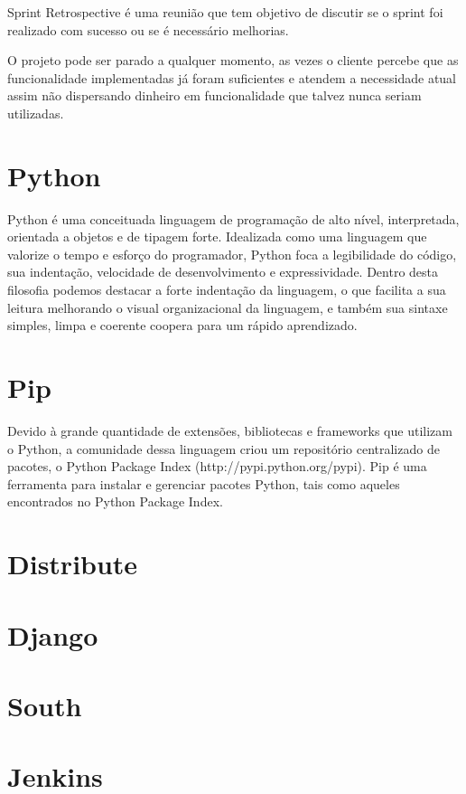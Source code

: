 \documentclass{abnt}
\begin{document}
		Sprint Retrospective é uma reunião que tem objetivo de discutir se o sprint foi realizado com sucesso ou se é
		necessário melhorias.
		
		O projeto pode ser parado a qualquer momento, as vezes o cliente percebe que as funcionalidade implementadas já foram
		suficientes e atendem a necessidade atual assim não dispersando dinheiro em funcionalidade que talvez nunca seriam
		utilizadas.
	
	\section{Python}
	\blindtext
		Python é uma conceituada linguagem de programação de alto nível, interpretada, orientada a objetos e de tipagem forte. Idealizada como uma linguagem que valorize o tempo e esforço do programador, Python foca a legibilidade do código, sua indentação, velocidade de desenvolvimento e expressividade. Dentro desta filosofia 
		podemos destacar a forte indentação da linguagem, o que facilita a sua leitura melhorando o visual organizacional da linguagem, e também sua sintaxe simples, limpa e coerente coopera para um rápido aprendizado.
	
	\section{Pip}
	\blindtext
		Devido à grande quantidade de extensões, bibliotecas e frameworks que utilizam o Python, a comunidade dessa linguagem criou um repositório centralizado de pacotes, o Python Package Index (http://pypi.python.org/pypi).
		Pip é uma ferramenta para instalar e gerenciar pacotes Python, tais como aqueles encontrados no Python Package Index.\cite{PIPSITE}
	\section{Distribute}
	\section{Django}
	
	
	\section{South}
	\section{Jenkins}
			
\end{document}
